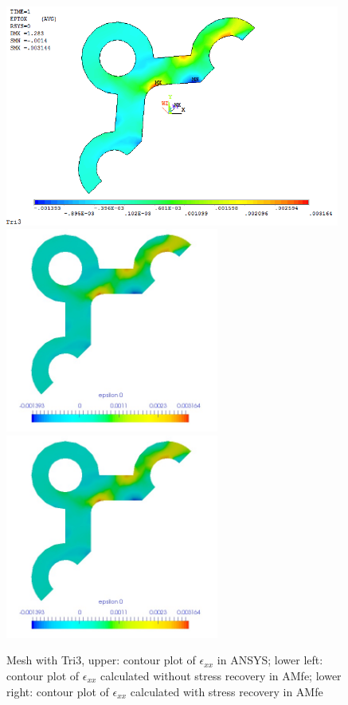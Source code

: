 \begin{figure}[htbp]
	\begin{center}
		\includegraphics[width=11cm,clip]{TTri3_Exx.png} 	
		\includegraphics[width=7cm,clip]{TTri3_Exx_PD.png} 	
		\includegraphics[width=7cm,clip]{TTri3_Exx_P.png} 	
		\caption{Mesh with Tri3, upper: contour plot of $\epsilon_{xx}$ in ANSYS; lower left: contour plot of $\epsilon_{xx}$ calculated without stress recovery in AMfe; lower right: contour plot of $\epsilon_{xx}$ calculated with stress recovery in AMfe} \label{fig: Tri3_Exx}
	\end{center}
\end{figure}
\clearpage 

